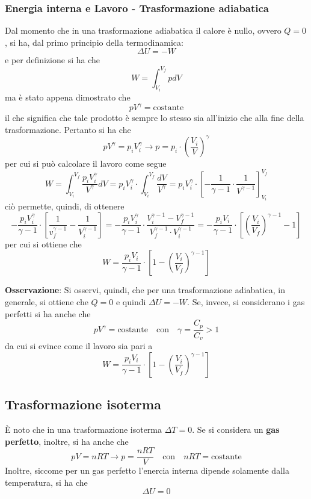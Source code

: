 \documentclass[a4paper]{extarticle}
\begin{document}
\vspace{1em}
\subsubsection{Energia interna e Lavoro - Trasformazione adiabatica}
Dal momento che in una trasformazione adiabatica il calore è nullo, ovvero $Q=0$, si ha, dal primo principio della termodinamica:
\[\Delta U = - W\]
e per definizione si ha che
\[W = \int_{V_i}^{V_f} p dV\]
ma è stato appena dimostrato che
\[p V^\gamma = \text{costante}\]
il che significa che tale prodotto è sempre lo stesso sia all'inizio che alla fine della trasformazione. Pertanto si ha che
\[p V^\gamma = p_i V_i^\gamma \longrightarrow p = p_i \cdot \left(\frac{V_i}{V} \right)^\gamma\]
per cui si può calcolare il lavoro come segue
\[W = \int_{V_i}^{V_f} \frac{p_i V_i^\gamma}{V^\gamma} dV = p_i V_i^\gamma \cdot \int_{V_i}^{V_f} \frac{dV}{V^\gamma} = p_i V_i^\gamma \cdot \left[- \frac{1}{\gamma-1} \cdot \frac{1}{V^{\gamma -1}}\right]_{V_i}^{V_f}\]
ciò permette, quindi, di ottenere
\[- \frac{p_i V_i^\gamma}{\gamma - 1} \cdot \left[\frac{1}{v_f^{\gamma-1}} - \frac{1}{V_i^{\gamma - 1}}\right] = - \frac{p_i V_i^\gamma}{\gamma - 1} \cdot \frac{V_i^{\gamma - 1} - V_f^{\gamma - 1}}{V_f^{\gamma -1} \cdot V_i^{\gamma - 1}} = - \frac{p_i V_i}{\gamma - 1} \cdot \left[\left(\frac{V_i}{V_f}\right)^{\gamma - 1} - 1\right]\]
per cui si ottiene che
\[\boxed{W = \frac{p_i V_i}{\gamma - 1} \cdot \left[1 - \left(\frac{V_i}{V_f}\right)^{\gamma - 1}\right]}\]

\vspace{1em}
\noindent
\textbf{Osservazione}: Si osservi, quindi, che per una trasformazione adiabatica, in generale, si ottiene che $Q=0$ e quindi $\Delta U = -W$. Se, invece, si considerano i gas perfetti si ha anche che
\[\boxed{p V^\gamma = \text{costante}} \hspace{1em} \text{con} \hspace{1em} \boxed{\gamma = \frac{C_p}{C_v} > 1}\]
da cui si evince come il lavoro sia pari a
\[\boxed{W = \frac{p_i V_i}{\gamma - 1} \cdot \left[1 - \left(\frac{V_i}{V_f}\right)^{\gamma - 1}\right]}\]

\vspace{1em}
\subsection{Trasformazione isoterma}
È noto che in una trasformazione isoterma $\Delta T = 0$. Se si considera un \textbf{gas perfetto}, inoltre, si ha anche che
\[pV = n R T \longrightarrow p = \frac{n R T}{V} \hspace{1em} \text{con} \hspace{1em} n R T = \text{costante}\]
Inoltre, siccome per un gas perfetto l'enercia interna dipende solamente dalla temperatura, si ha che
\[\Delta U = 0\]
\end{document}
